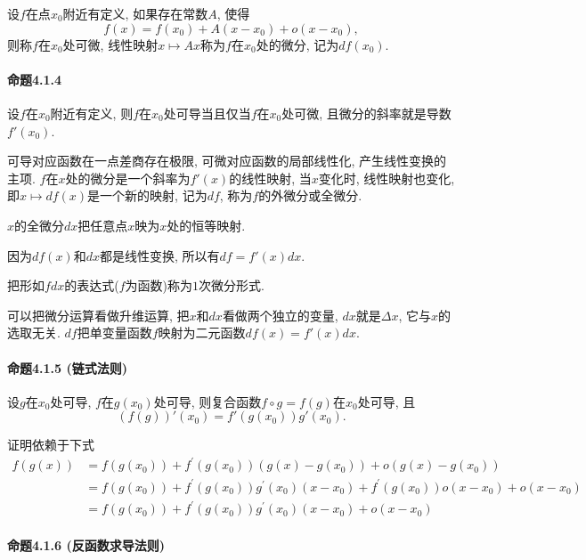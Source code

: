 设$f$在点$x_{0}$附近有定义, 如果存在常数$A$, 使得
\[
f(x)=f(x_{0})+A(x-x_{0})+o(x-x_{0}),
\]
则称$f$在$x_{0}$处可微, 线性映射$x\mapsto Ax$称为$f$在$x_{0}$处的微分, 记为$df(x_{0})$.

\paragraph{命题4.1.4}

设$f$在$x_{0}$附近有定义, 则$f$在$x_{0}$处可导当且仅当$f$在$x_{0}$处可微, 且微分的斜率就是导数$f'(x_{0})$.

可导对应函数在一点差商存在极限, 可微对应函数的局部线性化, 产生线性变换的主项. $f$在$x$处的微分是一个斜率为$f'(x)$的线性映射,
当$x$变化时, 线性映射也变化, 即$x\mapsto df(x)$是一个新的映射, 记为$df$, 称为$f$的外微分或全微分. 

$x$的全微分$dx$把任意点$x$映为$x$处的恒等映射. 

因为$df(x)$和$dx$都是线性变换, 所以有$df=f'(x)dx$.

把形如$fdx$的表达式($f$为函数)称为$1$次微分形式.

可以把微分运算看做升维运算, 把$x$和$dx$看做两个独立的变量, $dx$就是$\Delta x$, 它与$x$的选取无关.
$df$把单变量函数$f$映射为二元函数$df(x)=f'(x)dx$.

\paragraph{命题4.1.5 (链式法则)}

设$g$在$x_{0}$处可导, $f$在$g(x_{0})$处可导, 则复合函数$f\circ g=f(g)$在$x_{0}$处可导,
且
\[
\left(f(g)\right)'(x_{0})=f'\left(g(x_{0})\right)g'(x_{0}).
\]

证明依赖于下式
\[
\begin{aligned}f(g(x)) & =f\left(g\left(x_{0}\right)\right)+f^{\prime}\left(g\left(x_{0}\right)\right)\left(g(x)-g\left(x_{0}\right)\right)+o\left(g(x)-g\left(x_{0}\right)\right)\\
 & =f\left(g\left(x_{0}\right)\right)+f^{\prime}\left(g\left(x_{0}\right)\right)g^{\prime}\left(x_{0}\right)\left(x-x_{0}\right)+f^{\prime}\left(g\left(x_{0}\right)\right)o\left(x-x_{0}\right)+o\left(x-x_{0}\right)\\
 & =f\left(g\left(x_{0}\right)\right)+f^{\prime}\left(g\left(x_{0}\right)\right)g^{\prime}\left(x_{0}\right)\left(x-x_{0}\right)+o\left(x-x_{0}\right)
\end{aligned}
\]


\paragraph{命题4.1.6 (反函数求导法则)}

